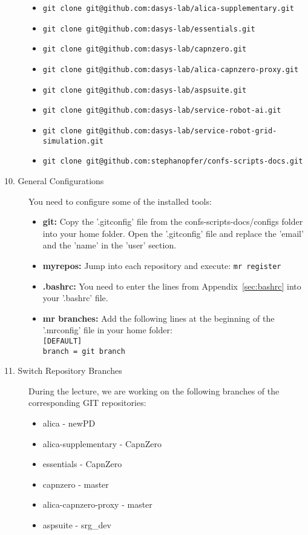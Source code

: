 \begin{description}
\begin{itemize}
		\item \verb#git clone git@github.com:dasys-lab/alica-supplementary.git#
		\item \verb#git clone git@github.com:dasys-lab/essentials.git#
		\item \verb#git clone git@github.com:dasys-lab/capnzero.git#
		\item \verb#git clone git@github.com:dasys-lab/alica-capnzero-proxy.git#
		\item \verb#git clone git@github.com:dasys-lab/aspsuite.git#
		\item \verb#git clone git@github.com:dasys-lab/service-robot-ai.git#
		\item \verb#git clone git@github.com:dasys-lab/service-robot-grid-simulation.git#
		\item \verb#git clone git@github.com:stephanopfer/confs-scripts-docs.git#
	\end{itemize}
	\item[10. General Configurations] You need to configure some of the installed tools:
		\begin{itemize}
			\item \textbf{git:} Copy the '.gitconfig' file from the confs-scripts-docs/configs folder into your home folder. Open the '.gitconfig' file and replace the 'email' and the 'name' in the 'user' section.
			\item \textbf{myrepos:} Jump into each repository and execute: \verb#mr register#
			\item \textbf{.bashrc:} You need to enter the lines from Appendix~\ref{sec:bashrc} into your '.bashrc' file.
			\item \textbf{mr branches:} Add the following lines at the beginning of the '.mrconfig' file in your home folder:\\
			\verb#[DEFAULT]#\\
			\verb#branch = git branch#
		\end{itemize}
	\item[11. Switch Repository Branches] During the lecture, we are working on the following branches of the corresponding GIT repositories:
	\begin{itemize}
		\item alica - newPD
		\item alica-supplementary - CapnZero
		\item essentials - CapnZero
		\item capnzero - master
		\item alica-capnzero-proxy - master		
		\item aspsuite - srg\_dev

\end{itemize}
\end{description}
